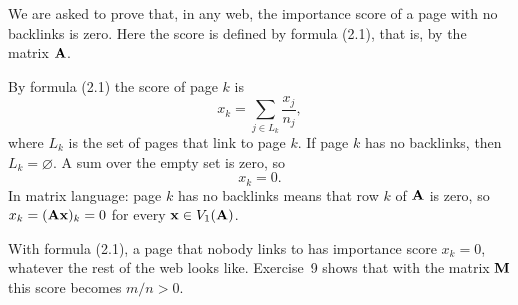 

We are asked to prove that, in any web, the importance score of a page with no backlinks is zero.
Here the score is defined by formula (2.1), that is, by the matrix $\mathbf{A}$.


By formula (2.1) the score of page $k$ is
\[
  x_k = \sum_{j \in L_k} \frac{x_j}{n_j},
\]
where $L_k$ is the set of pages that link to page $k$.
If page $k$ has no backlinks, then $L_k = \varnothing$.
A sum over the empty set is zero, so
\[
  x_k = 0 .
\]
In matrix language: page $k$ has no backlinks means that row $k$ of $\mathbf{A}$ is zero, so $x_k = (\mathbf{A}\mathbf{x})_k = 0$ for every $\mathbf{x} \in V_1(\mathbf{A})$.


With formula (2.1), a page that nobody links to has importance score $x_k = 0$, whatever the rest of the web looks like.
Exercise~9 shows that with the matrix $\mathbf{M}$ this score becomes $m/n > 0$.
